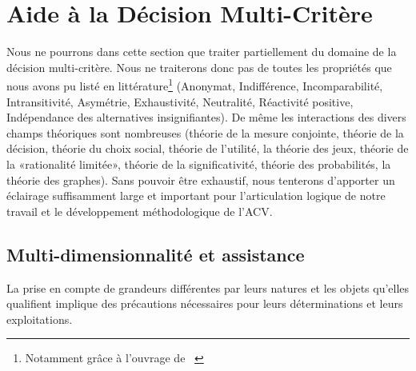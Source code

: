 \section{Aide à la Décision Multi-Critère}
\label{sec:ADMC}
Nous ne pourrons dans cette section que traiter partiellement du domaine de la décision multi-critère.
Nous ne traiterons donc pas de toutes les propriétés que nous avons pu listé en littérature\footnote{Notamment grâce à l'ouvrage de \citeauthor{bouyssou_evaluation_2006}~\cite{bouyssou_evaluation_2006}}
(Anonymat,
Indifférence,
Incomparabilité,
Intransitivité,
Asymétrie,
Exhaustivité,
Neutralité,
Réactivité positive,
Indépendance des alternatives insignifiantes).
De même les interactions des divers champs théoriques sont nombreuses (théorie de la mesure conjointe,
théorie de la décision,
théorie du choix social,
théorie de l'utilité,
la théorie des jeux,
théorie de la «rationalité limitée»,
théorie de la significativité,
théorie des probabilités,
la théorie des graphes).
Sans pouvoir être exhaustif, nous tenterons d'apporter un éclairage suffisamment large et important pour l'articulation logique de notre travail et le développement méthodologique de l'\gls{ACV}.
%
%
%
%
%
%
%
%
\subsection{Multi-dimensionnalité et assistance}

La prise en compte de grandeurs différentes par leurs natures et les objets qu'elles qualifient implique des précautions nécessaires pour leurs déterminations et leurs exploitations.

